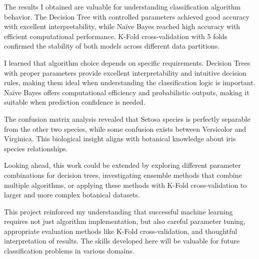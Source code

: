 \documentclass[12pt,a4paper]{article}
\begin{document}
The results I obtained are valuable for understanding classification algorithm behavior. The Decision Tree with controlled parameters achieved good accuracy with excellent interpretability, while Na\"{i}ve Bayes reached high accuracy with efficient computational performance. K-Fold cross-validation with 5 folds confirmed the stability of both models across different data partitions.

I learned that algorithm choice depends on specific requirements. Decision Trees with proper parameters provide excellent interpretability and intuitive decision rules, making them ideal when understanding the classification logic is important. Na\"{i}ve Bayes offers computational efficiency and probabilistic outputs, making it suitable when prediction confidence is needed.

The confusion matrix analysis revealed that Setosa species is perfectly separable from the other two species, while some confusion exists between Versicolor and Virginica. This biological insight aligns with botanical knowledge about iris species relationships.

Looking ahead, this work could be extended by exploring different parameter combinations for decision trees, investigating ensemble methods that combine multiple algorithms, or applying these methods with K-Fold cross-validation to larger and more complex botanical datasets.

This project reinforced my understanding that successful machine learning requires not just algorithm implementation, but also careful parameter tuning, appropriate evaluation methods like K-Fold cross-validation, and thoughtful interpretation of results. The skills developed here will be valuable for future classification problems in various domains.
\end{document}
